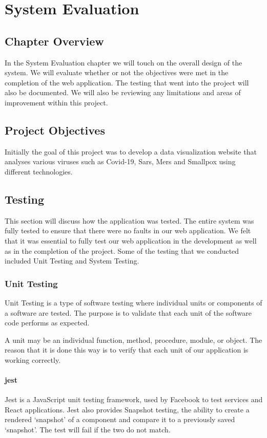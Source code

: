\chapter{System Evaluation}

\section{Chapter Overview}
In the System Evaluation chapter we will touch on the overall design of the system.
We will evaluate whether or not the objectives were met in the completion of the web application.
The testing that went into the project will also be documented.
We will also be reviewing any limitations and areas of improvement within this project.

\section{Project Objectives}
Initially the goal of this project was to develop a data visualization website that analyses various viruses such as Covid-19, Sars, Mers and Smallpox using different technologies.

\section{Testing}
This section will discuss how the application was tested.
The entire system was fully tested to ensure that there were no faults in our web application.
We felt that it was essential to fully test our web application in the development as well as in the completion of the project.
Some of the testing that we conducted included Unit Testing and System Testing.


\subsection{Unit Testing}
Unit Testing is a type of software testing where individual units or components of a software are tested. 
The purpose is to validate that each unit of the software code performs as expected.

A unit may be an individual function, method, procedure, module, or object.\cite{unittest}
The reason that it is done this way is to verify that each unit of our application is working correctly.


\subsubsection{jest}
Jest is a JavaScript unit testing framework, used by Facebook to test services and React applications.
Jest also provides Snapshot testing, the ability to create a rendered ‘snapshot’ of a component and compare it to a previously saved ‘snapshot’. The test will fail if the two do not match.\cite{jest}

